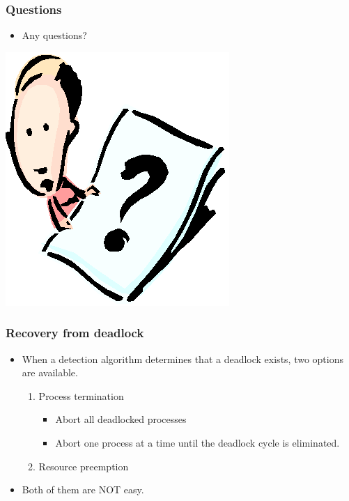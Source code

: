 \documentclass[CJKutf8,xcolor=pdftex,dvipsnames,table]{beamer}
\begin{document}
\begin{CJK*}{UTF8}{song}
  \begin{frame}
  \frametitle{Questions}
  \begin{itemize}
  \item{Any questions?}
  \end{itemize}
  \begin{center}
    \includegraphics[scale=.5]{question}
  \end{center}
  \end{frame}

  \begin{frame}
  \frametitle{Recovery from deadlock} \pause
  \begin{itemize}
  \item{When a detection algorithm determines that a deadlock exists, two options are available.} \pause
    \begin{enumerate}
    \item{Process termination} \pause
      \begin{itemize}
      \item{Abort all deadlocked processes} \pause
      \item{Abort one process at a time until the deadlock cycle is eliminated.} \pause
      \end{itemize}
    \item{Resource preemption} \pause
    \end{enumerate}
  \item{Both of them are NOT easy.}
  \end{itemize}
  \end{frame}


\end{CJK*}
\end{document}

